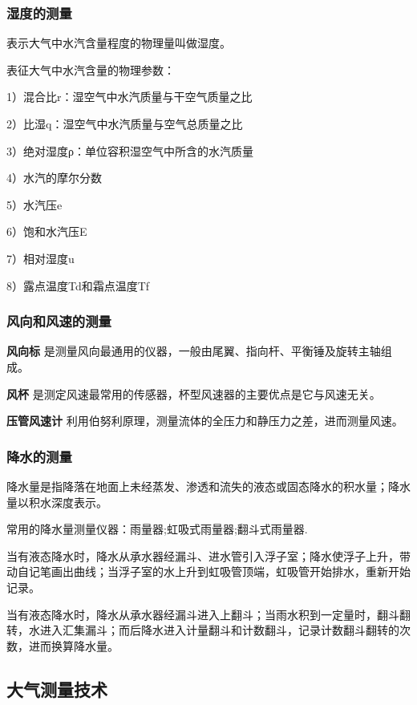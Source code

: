 \documentclass[12pt,a4paper]{article}
\begin{document}
	\subsubsection{湿度的测量}
	
	表示大气中水汽含量程度的物理量叫做湿度。
	
	表征大气中水汽含量的物理参数：
	
	1）混合比r：湿空气中水汽质量与干空气质量之比
	
	2）比湿q：湿空气中水汽质量与空气总质量之比
	
	3）绝对湿度ρ：单位容积湿空气中所含的水汽质量
	
	4）水汽的摩尔分数
	
	5）水汽压e
	
	6）饱和水汽压E
	
	7）相对湿度u
	
	8）露点温度Td和霜点温度Tf
	
	\subsubsection{风向和风速的测量}
	
	\textbf{风向标} 是测量风向最通用的仪器，一般由尾翼、指向杆、平衡锤及旋转主轴组成。
	
	\textbf{风杯} 是测定风速最常用的传感器，杯型风速器的主要优点是它与风速无关。
	
	\textbf{压管风速计} 利用伯努利原理，测量流体的全压力和静压力之差，进而测量风速。
	
	\subsubsection{降水的测量}
	
	降水量是指降落在地面上未经蒸发、渗透和流失的液态或固态降水的积水量；降水量以积水深度表示。
	
	常用的降水量测量仪器：雨量器;虹吸式雨量器;翻斗式雨量器.
	
	当有液态降水时，降水从承水器经漏斗、进水管引入浮子室；降水使浮子上升，带动自记笔画出曲线；当浮子室的水上升到虹吸管顶端，虹吸管开始排水，重新开始记录。
	
	当有液态降水时，降水从承水器经漏斗进入上翻斗；当雨水积到一定量时，翻斗翻转，水进入汇集漏斗；而后降水进入计量翻斗和计数翻斗，记录计数翻斗翻转的次数，进而换算降水量。
	
	\subsection{大气测量技术}
\end{document}
